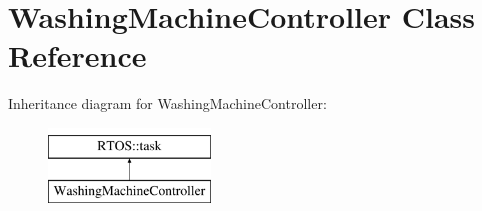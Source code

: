 \hypertarget{class_washing_machine_controller}{}\section{Washing\+Machine\+Controller Class Reference}
\label{class_washing_machine_controller}
Inheritance diagram for Washing\+Machine\+Controller\+:\begin{figure}[H]
\begin{center}
\leavevmode
\includegraphics[height=2.000000cm]{class_washing_machine_controller}
\end{center}
\end{figure}
